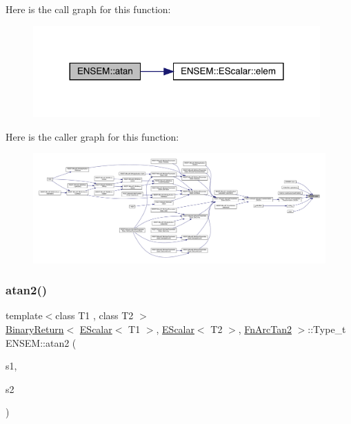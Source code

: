 Here is the call graph for this function\+:\nopagebreak
\begin{figure}[H]
\begin{center}
\leavevmode
\includegraphics[width=312pt]{d4/dca/group__escalar_ga3169598490417ab5713660967ec6b658_cgraph}
\end{center}
\end{figure}
Here is the caller graph for this function\+:\nopagebreak
\begin{figure}[H]
\begin{center}
\leavevmode
\includegraphics[width=350pt]{d4/dca/group__escalar_ga3169598490417ab5713660967ec6b658_icgraph}
\end{center}
\end{figure}
\mbox{\label{group__escalar_ga9a9d48948d119981259ad0ebcb0acfea}} 
\subsubsection{\texorpdfstring{atan2()}{atan2()}}
{\footnotesize\ttfamily template$<$class T1 , class T2 $>$ \\
\mbox{\hyperlink{structENSEM_1_1BinaryReturn}{Binary\+Return}}$<$ \mbox{\hyperlink{classENSEM_1_1EScalar}{E\+Scalar}}$<$ T1 $>$, \mbox{\hyperlink{classENSEM_1_1EScalar}{E\+Scalar}}$<$ T2 $>$, \mbox{\hyperlink{structENSEM_1_1FnArcTan2}{Fn\+Arc\+Tan2}} $>$\+::Type\+\_\+t E\+N\+S\+E\+M\+::atan2 (\begin{DoxyParamCaption}\item[{const \mbox{\hyperlink{classENSEM_1_1EScalar}{E\+Scalar}}$<$ T1 $>$ \&}]{s1,  }\item[{const \mbox{\hyperlink{classENSEM_1_1EScalar}{E\+Scalar}}$<$ T2 $>$ \&}]{s2 }\end{DoxyParamCaption})\hspace{0.3cm}{\ttfamily [inline]}}



